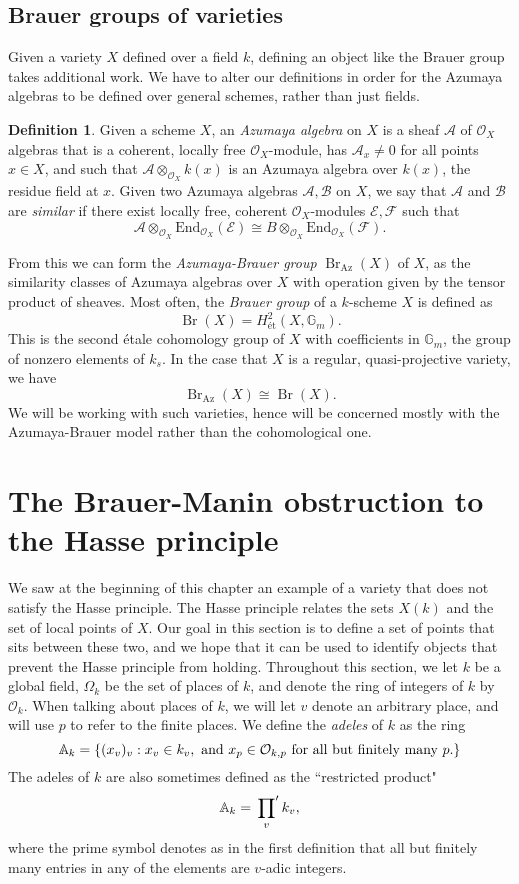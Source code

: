 \documentclass[12pt,twoside]{reedthesis}
\theoremstyle{plain}
\theoremstyle{definition}
\newtheorem{definition}{Definition}[section]
\theoremstyle{remark}
\newcommand{\Affine}{\mathbb{A}}
\newcommand{\calA}{\mathcal{A}}
\newcommand{\calO}{\mathcal{O}}
\newcommand{\Br}{\operatorname{Br}}
\newcommand{\adele}{\reflectbox{$\Affine$}}
\begin{document}
\subsection{Brauer groups of varieties}
Given a variety $X$ defined over a field $k$, defining an object like the Brauer group takes additional work. We have to alter our definitions in order for the Azumaya algebras to be defined over general schemes, rather than just fields.
\begin{definition}
Given a scheme $X$, an \emph{Azumaya algebra} on $X$ is a sheaf $\calA$ of $\calO_X$ algebras that is a coherent, locally free $\calO_X$-module, has $\calA_x\neq0$ for all points $x\in X$, and such that $\calA\otimes_{\calO_X} k(x)$ is an Azumaya algebra over $k(x)$, the residue field at $x$. Given two Azumaya algebras $\mathcal{A},\mathcal{B}$ on $X$, we say that $\mathcal{A}$ and $\mathcal{B}$ are \emph{similar} if there exist locally free, coherent $\calO_X$-modules $\mathcal{E},\mathcal{F}$ such that 
\[
\mathcal{A}\otimes_{\calO_X}\text{End}_{\calO_X}(\mathcal{E})\cong B\otimes_{\calO_X}\text{End}_{\calO_X}(\mathcal{F}).
\]
\end{definition}
From this we can form the \emph{Azumaya-Brauer group} $\Br_\text{Az}(X)$ of $X$, as the similarity classes of Azumaya algebras over $X$ with operation given by the tensor product of sheaves. Most often, the \emph{Brauer group} of a $k$-scheme $X$ is defined as \[\Br(X)=H^2_\text{\'et}(X,\mathbb{G}_m).\] This is the second \'etale cohomology group of $X$ with coefficients in $\mathbb{G}_m$, the group of nonzero elements of $k_s$. In the case that $X$ is a regular, quasi-projective variety, we have \[\Br_\text{Az}(X)\cong \Br(X).\] We will be working with such varieties, hence will be concerned mostly with the Azumaya-Brauer model rather than the cohomological one.

\section{The Brauer-Manin obstruction to the Hasse principle}
We saw at the beginning of this chapter an example of a variety that does not satisfy the Hasse principle. The Hasse principle relates the sets $X(k)$ and the set of local points of $X$. Our goal in this section is to define a set of points that sits between these two, and we hope that it can be used to identify objects that prevent the Hasse principle from holding.
Throughout this section, we let $k$ be a global field, $\Omega_k$ be the set of places of $k$, and denote the ring of integers of $k$ by $\calO_k$. When talking about places of $k$, we will let $v$ denote an arbitrary place, and will use $p$ to refer to the finite places. We define the \emph{adeles} of $k$ as the ring
\[
\adele_k=\{(x_v)_v:x_v\in k_v,\text{ and } x_p\in\calO_{k,p}\text{ for all but finitely many $p$.}\}
\]
The adeles of $k$ are also sometimes defined as the ``restricted product"
\[
\adele_k=\sideset{}{^\prime}\prod_v k_v,
\]
where the prime symbol denotes as in the first definition that all but finitely many entries in any of the elements are $v$-adic integers.
\end{document}

